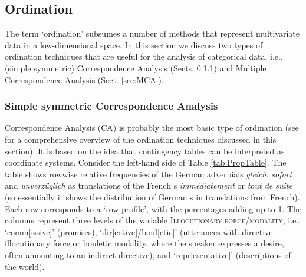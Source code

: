 \subsection{Ordination}\label{sec:Ordination}


The term `ordination' subsumes a number of methods that represent multivariate data 
in a low-dimensional space. 
%
%
In this section we discuss two types of ordination techniques that are
useful for the analysis of categorical data, i.e., (simple symmetric)
Correspondence Analysis (Sects. \ref{sec:CA}) and Multiple Correspondence
Analysis (Sect. \ref{sec:MCA}).

\subsubsection{Simple symmetric Correspondence Analysis}\label{sec:CA}

Correspondence Analysis (CA) is probably the most basic type of
ordination (see \citealt{Greenacre2016} for a comprehensive overview
of the ordination techniques discussed in this section). It is based
on the idea that contingency tables can be interpreted as coordinate
systems. Consider the left-hand side of Table \ref{tab:PropTable}. The
table shows rowwise relative frequencies of the German adverbials
\textit{gleich}, \textit{sofort} and \textit{unverzüglich} as
translations of the French \ipadv s \textit{immédiatement} or
\textit{tout de suite} (so essentially it shows the distribution of
German \ipadv s in translations from French).  Each row corresponds to
a `row profile', with the percentages adding up to 1. The columns
represent three levels of the variable \textsc{Illocutionary
  force/modality}, i.e., `comm[issive]' (promises),
`dir[ective]/boul[etic]' (utterances with directive illocutionary
force or bouletic modality, where the speaker expresses a desire,
often amounting to an indirect directive), and `repr[esentative]'
(descriptions of the world).

